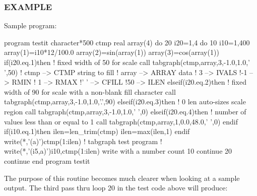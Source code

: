 \subsubsection*{E\+X\+A\+M\+P\+LE}

Sample program\+: \begin{DoxyVerb} program testit
 character*500 ctmp
 real array(4)
 do 20 i20=1,4
 do 10 i10=1,400
    array(1)=i10*12/100.0
    array(2)=sin(array(1))
    array(3)=cos(array(1))
    if(i20.eq.1)then
       ! fixed width of 50 for scale
       call tabgraph(ctmp,array,3,-1.0,1.0,' ',50)
       ! ctmp  --> CTMP string to fill
       ! array --> ARRAY data
       ! 3     --> IVALS
       !-1     --> RMIN
       ! 1     --> RMAX
       !' '    --> CFILL
       !50     --> ILEN
    elseif(i20.eq.2)then
       ! fixed width of 90 for scale with a non-blank fill character
       call tabgraph(ctmp,array,3,-1.0,1.0,'.',90)
    elseif(i20.eq.3)then
       ! 0 len auto-sizes scale region
       call tabgraph(ctmp,array,3,-1.0,1.0,' ',0)
    elseif(i20.eq.4)then
      ! number of values less than or equal to 1
      call tabgraph(ctmp,array,1,0.0,48.0,' ',0)
    endif
    if(i10.eq.1)then
       ilen=len_trim(ctmp)
       ilen=max(ilen,1)
    endif
    write(*,'(a)')ctmp(1:ilen) ! tabgraph test program
    ! write(*,'(i5,a)')i10,ctmp(1:ilen) write with a number count
 10     continue
 20     continue
 end program testit
\end{DoxyVerb}


The purpose of this routine becomes much clearer when looking at a sample output. The third pass thru loop 20 in the test code above will produce\+:

